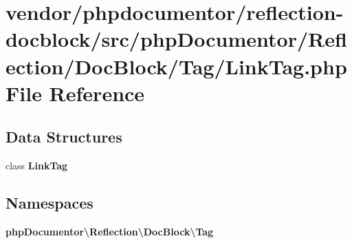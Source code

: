 \section{vendor/phpdocumentor/reflection-\/docblock/src/php\+Documentor/\+Reflection/\+Doc\+Block/\+Tag/\+Link\+Tag.php File Reference}
\label{_link_tag_8php}
\subsection*{Data Structures}
\begin{DoxyCompactItemize}
\item 
class {\bf Link\+Tag}
\end{DoxyCompactItemize}
\subsection*{Namespaces}
\begin{DoxyCompactItemize}
\item 
 {\bf php\+Documentor\textbackslash{}\+Reflection\textbackslash{}\+Doc\+Block\textbackslash{}\+Tag}
\end{DoxyCompactItemize}
